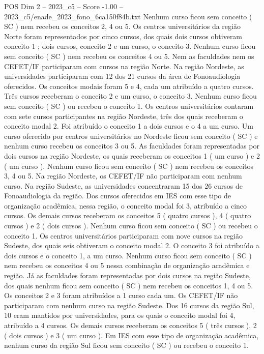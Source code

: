 \begin{textsample}{POS Dim 2 – 2023\_c5 – Score -1.00 – 2023\_c5/enade\_2023\_fono\_6ca150f84b.txt}
Nenhum curso ficou sem conceito ( SC ) nem recebeu os conceitos 2, 4 ou 5.
Os centros universitários da região Norte foram representados por cinco cursos, dos quais dois cursos obtiveram conceito 1 ; dois cursos, conceito 2 e um curso, o conceito 3.
Nenhum curso ficou sem conceito ( SC ) nem recebeu os conceitos 4 ou 5.
Nem as faculdades nem os CEFET/IF participaram com cursos na região Norte.
Na região Nordeste, as universidades participaram com 12 dos 21 cursos da área de Fonoaudiologia oferecidos.
Os conceitos modais foram 5 e 4, cada um atribuído a quatro cursos.
Três cursos receberam o conceito 2 e um curso, o conceito 3.
Nenhum curso ficou sem conceito ( SC ) ou recebeu o conceito 1.
Os centros universitários contaram com sete cursos participantes na região Nordeste, três dos quais receberam o conceito modal 2.
Foi atribuído o conceito 1 a dois cursos e o 4 a um curso.
Um curso oferecido por centros universitários no Nordeste ficou sem conceito ( SC ) e nenhum curso recebeu os conceitos 3 ou 5.
As faculdades foram representadas por dois cursos na região Nordeste, os quais receberam os conceitos 1 ( um curso ) e 2 ( um curso ).
Nenhum curso ficou sem conceito ( SC ) nem recebeu os conceitos 3, 4 ou 5.
Na região Nordeste, os CEFET/IF não participaram com nenhum curso.
Na região Sudeste, as universidades concentraram 15 dos 26 cursos de Fonoaudiologia da região.
Dos cursos oferecidos em IES com esse tipo de organização acadêmica, nessa região, o conceito modal foi 3, atribuído a cinco cursos.
Os demais cursos receberam os conceitos 5 ( quatro cursos ), 4 ( quatro cursos ) e 2 ( dois cursos ).
Nenhum curso ficou sem conceito ( SC ) ou recebeu o conceito 1.
Os centros universitários participaram com nove cursos na região Sudeste, dos quais seis obtiveram o conceito modal 2.
O conceito 3 foi atribuído a dois cursos e o conceito 1, a um curso.
Nenhum curso ficou sem conceito ( SC ) nem recebeu os conceitos 4 ou 5 nessa combinação de organização acadêmica e região.
Já as faculdades foram representadas por dois cursos na região Sudeste, dos quais nenhum ficou sem conceito ( SC ) nem recebeu os conceitos 1, 4 ou 5.
Os conceitos 2 e 3 foram atribuídos a 1 curso cada um.
Os CEFET/IF não participaram com nenhum curso na região Sudeste.
Dos 16 cursos da região Sul, 10 eram mantidos por universidades, para os quais o conceito modal foi 4, atribuído a 4 cursos.
Os demais cursos receberam os conceitos 5 ( três cursos ), 2 ( dois cursos ) e 3 ( um curso ).
Em IES com esse tipo de organização acadêmica, nenhum curso da região Sul ficou sem conceito ( SC ) ou recebeu o conceito 1.

\end{textsample}
